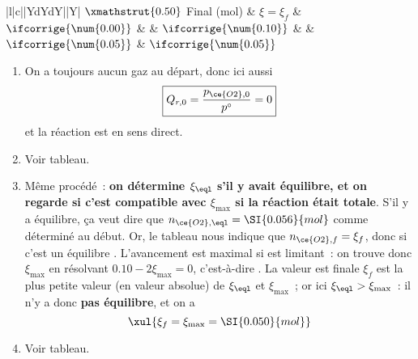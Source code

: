 \documentclass[../TDTM2.tex]{subfiles}%
\begin{document}
{\begin{center}
\begin{tabularx}{\linewidth}{|l|c||YdYdY||Y|}
			$\xmathstrut{\rhgt}$
			Final  (\si{mol})        & $\xi = \xi_f$        &
			$\ifcorrige{\num{0.00}}$ & \vline               &
			$\ifcorrige{\num{0.10}}$ & \vline               &
			$\ifcorrige{\num{0.05}}$ &
			$\ifcorrige{\num{0.05}}$                          \\
			\hline
		\end{tabularx}
	\end{center}
	\begin{enumerate}[leftmargin=20pt, label=\alph* --]
		\item On a toujours aucun gaz au départ, donc ici aussi
		      \[\boxed{Q_{r,0} = \frac{p_{\ce{O2}, 0}}{p^\circ} = 0}\]
		      et la réaction est en sens direct.
		\item Voir tableau.
		\item Même procédé~: \textbf{on détermine $\xi_{\eql}$ s'il y avait
			      équilibre, et on regarde si c'est compatible avec $\xi_{\max}$
			      si la réaction était totale}.
		      \bigbreak
		      S'il y a équilibre, ça veut dire que $n_{\ce{O2}, \eql} =
			      \SI{0.056}{mol}$ comme déterminé au début. Or, le tableau nous
		      indique que $n_{\ce{O2}, f} = \xi_f$, donc si c'est un équilibre
		      .
		      \bigbreak
		      L'avancement est maximal si  est limitant~: on trouve donc
		      $\xi_{\max}$ en résolvant $\num{0.10} - 2\xi_{\max} = 0$,
		      c'est-à-dire .
		      \bigbreak
		      La valeur est finale $\xi_f$ est la plus petite valeur (en valeur
		      absolue) de $\xi_{\eql}$ et $\xi_{\max}$~; or ici $\xi_{\eql} >
			      \xi_{\max}$~: il n'y a donc \textbf{pas équilibre}, et on a
		      \[\xul{\xi_f = \xi_{\max} = \SI{0.050}{mol}}\]
		\item Voir tableau.
	\end{enumerate}
}
\end{document}
